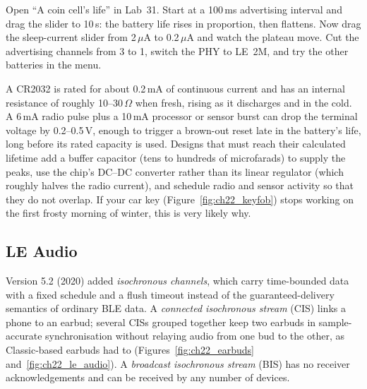 
\begin{tryit}
Open ``A coin cell's life'' in Lab~31. Start at a 100\,ms advertising interval and drag the slider to
10\,s: the battery life rises in proportion, then flattens. Now drag the sleep-current slider from
2\,$\mu$A to 0.2\,$\mu$A and watch the plateau move. Cut the advertising channels from 3 to 1, switch
the PHY to LE~2M, and try the other batteries in the menu.
\end{tryit}

\begin{pitfall}
A CR2032 is rated for about 0.2\,mA of continuous current and has an internal resistance of roughly
10--30\,$\Omega$ when fresh, rising as it discharges and in the cold. A 6\,mA radio pulse plus a
10\,mA processor or sensor burst can drop the terminal voltage by 0.2--0.5\,V, enough to trigger a
brown-out reset late in the battery's life, long before its rated capacity is used. Designs that must
reach their calculated lifetime add a buffer capacitor (tens to hundreds of microfarads) to supply
the peaks, use the chip's DC--DC converter rather than its linear regulator (which roughly halves the
radio current), and schedule radio and sensor activity so that they do not overlap. If your car key (Figure~\ref{fig:ch22_keyfob})
stops working on the first frosty morning of winter, this is very likely why.
\end{pitfall}

\subsection{LE Audio}

Version 5.2 (2020) added \emph{isochronous channels}, which carry time-bounded data with a fixed
schedule and a flush timeout instead of the guaranteed-delivery semantics of ordinary BLE data. A
\emph{connected isochronous stream} (CIS) links a phone to an earbud; several CISs grouped together
keep two earbuds in sample-accurate synchronisation without relaying audio from one bud to the other,
as Classic-based earbuds had to (Figures~\ref{fig:ch22_earbuds} and~\ref{fig:ch22_le_audio}). A \emph{broadcast isochronous stream}
(BIS) has no receiver acknowledgements and can be received by any number of devices.

